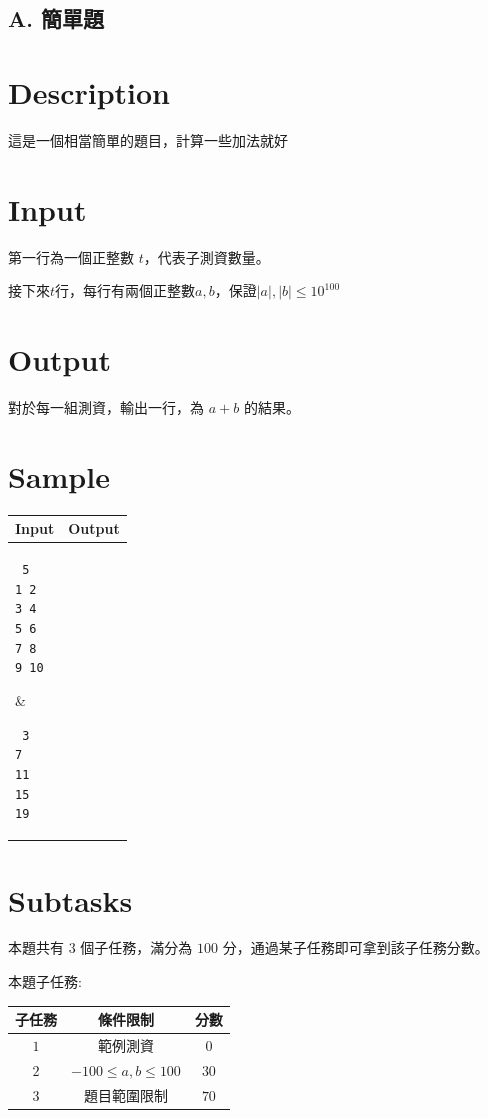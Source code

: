 \documentclass[11pt,a4paper]{article}
\begin{document}
\begin{center}
\section*{A. 簡單題}
\end{center}

\section*{Description}

這是一個相當簡單的題目，計算一些加法就好

\section*{Input}
第一行為一個正整數 $t$，代表子測資數量。

接下來$t$行，每行有兩個正整數$a, b$，保證$|a|, |b| \leq 10^{100}$


\section*{Output}

對於每一組測資，輸出一行，為 $a+b$ 的結果。

\section*{Sample}
\begin{longtable}[!h]{|p{}|p{}|}
\hline
\textbf {Input}	& \textbf {Output} \\
\hline
\parbox[t]{0.5\textwidth} %
{ \tt
5\\
1 2\\
3 4\\
5 6\\
7 8\\
9 10\\
} &
\parbox[t]{0.5\textwidth}
{ \tt
3\\
7\\
11\\
15\\
19\\
} \\
\hline
\end{longtable}


\section*{Subtasks}

本題共有 $3$ 個子任務，滿分為 $100$ 分，通過某子任務即可拿到該子任務分數。

本題子任務:

\begin{center}
    \begin{tabular}{||c c c||}
    \hline
    子任務 & 條件限制 & 分數 \\
    \hline
    $1$ & 範例測資 & $0$ \\
    \hline
    $2$ & $-100 \leq a, b \leq 100$ & $30$  \\
    \hline
    $3$ & 題目範圍限制 & $70$ \\
    \hline
    \end{tabular}
\end{center}
\end{document}
